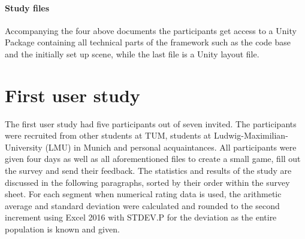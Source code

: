\paragraph{Study files} Accompanying the four above documents the participants get access to a Unity Package containing all technical parts of the framework such as the code base and the initially set up scene, while the last file is a Unity layout file. 

\section{First user study}
The first user study had five participants out of seven invited. The participants were recruited from other students at TUM, students at Ludwig-Maximilian-University (LMU) in Munich and personal acquaintances. All participants were given four days as well as all aforementioned files to create a small game, fill out the survey and send their feedback. The statistics and results of the study are discussed in the following paragraphs, sorted by their order within the survey sheet.
For each segment when numerical rating data is used, the arithmetic average and standard deviation were calculated and rounded to the second increment using Excel 2016 with STDEV.P for the deviation as the entire population is known and given.
